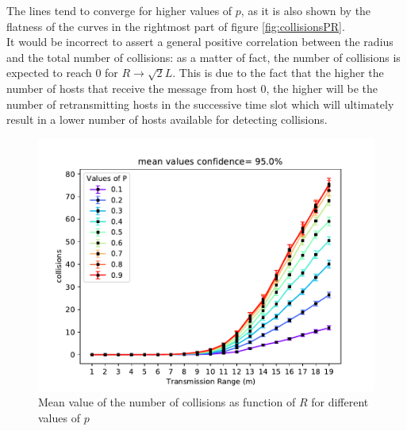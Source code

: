 The lines tend to converge for higher values of $p$, as it is also shown by the
flatness of the curves in the rightmost part of figure \ref{fig:collisionsPR}.\\
It would be incorrect to assert a general positive correlation between the
radius and the total number of collisions: as a matter of fact, the number of
collisions is expected to reach $0$ for $R \to \sqrt{2}L$. This is due to the
fact that the higher the number of hosts that receive the message from host $0$,
the higher will be the number of retransmitting hosts in the successive time
slot which will ultimately result in a lower number of hosts available for
detecting collisions.
\begin{figure}[H]
    \begin{center}
        \includegraphics[scale=.65,trim={0 0 0 0.8cm},clip]{img/big_collisions_r_mean_95.0.pdf}
    \end{center}
    \caption{Mean value of the number of collisions as function of $R$ for different values of $p$}
    \label{fig:collisionsRP}
\end{figure}
